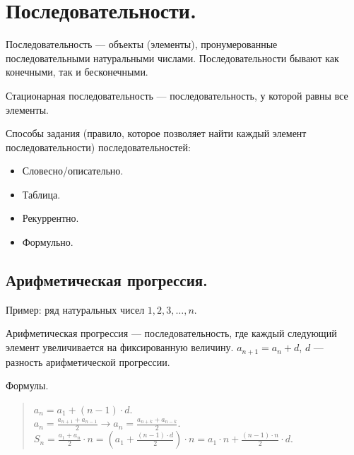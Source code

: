 \documentclass{article}
\begin{document}
	\tableofcontents
	\setcounter{tocdepth}{3}
	\newpage
	\section{Последовательности.}
	\begin{definition}
		Последовательность --- объекты (элементы), пронумерованные последовательными натуральными числами. Последовательности бывают как конечными, так и бесконечными.
	\end{definition}
	\begin{definition}
		Стационарная последовательность --- последовательность, у которой равны все элементы.
	\end{definition}
	\begin{note}
		Способы задания (правило, которое позволяет найти каждый элемент последовательности) последовательностей:
		\begin{itemize}
			\item Словесно/описательно.
			\item Таблица.
			\item Рекуррентно.
			\item Формульно.
		\end{itemize}
	\end{note}
	\subsection{Арифметическая прогрессия.}
	Пример: ряд натуральных чисел $1, 2, 3, \dots, n$.
	\begin{definition}
		Арифметическая прогрессия --- последовательность, где каждый следующий элемент увеличивается на фиксированную величину. $a_{n + 1} = a_n + d$, $d$ --- разность арифметической прогрессии.
	\end{definition}
	\begin{statement}
		Формулы.
		\begin{quote}
			$a_n = a_1 + (n - 1) \cdot d$. \\
			$a_n = \frac{a_{n + 1} + a_{n - 1}}{2} \rightarrow a_n = \frac{a_{n + k} + a_{n - k}}{2}$. \\
			$S_n = \frac{a_1 + a_n}{2} \cdot n = (a_1 + \frac{(n - 1) \cdot d}{2}) \cdot n = a_1 \cdot n + \frac{(n - 1) \cdot n}{2} \cdot d$.
		\end{quote}
	\end{statement}
\end{document}
